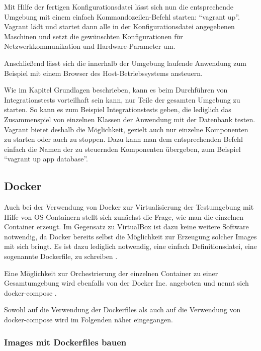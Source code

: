Mit Hilfe der fertigen Konfigurationsdatei lässt sich nun die entsprechende Umgebung mit einem einfach Kommandozeilen-Befehl starten: "`vagrant up"'. Vagrant lädt und startet dann alle in der Konfigurationsdatei angegebenen Maschinen und setzt die gewünschten Konfigurationen für Netzwerkkommunikation und Hardware-Parameter um.

Anschließend lässt sich die innerhalb der Umgebung laufende Anwendung zum Beispiel mit einem Browser des Host-Betriebssystems ansteuern.

Wie im Kapitel Grundlagen beschrieben, kann es beim Durchführen von Integrationstests vorteilhaft sein kann, nur Teile der gesamten Umgebung zu starten. So kann es zum Beispiel Integrationstests geben, die lediglich das Zusammenspiel von einzelnen Klassen der Anwendung mit der Datenbank testen. Vagrant bietet deshalb die Möglichkeit, gezielt auch nur einzelne Komponenten zu starten oder auch zu stoppen. Dazu kann man dem entsprechenden Befehl einfach die Namen der zu steuernden Komponenten übergeben, zum Beispiel "`vagrant up app database"'.

\subsection{Docker}

Auch bei der Verwendung von Docker zur Virtualisierung der Testumgebung mit Hilfe von OS-Containern stellt sich zunächst die Frage, wie man die einzelnen Container erzeugt. Im Gegensatz zu VirtualBox ist dazu keine weitere Software notwendig, da Docker bereits selbst die Möglichkeit zur Erzeugung solcher Images mit sich bringt. Es ist dazu lediglich notwendig, eine einfach Definitionsdatei, eine sogenannte Dockerfile, zu schreiben \citep[Vgl.][]{docker:003}.

Eine Möglichkeit zur Orchestrierung der einzelnen Container zu einer Gesamtumgebung wird ebenfalls von der Docker Inc. angeboten und nennt sich docker-compose \citep[Vgl.][]{dockercompose}.

Sowohl auf die Verwendung der Dockerfiles als auch auf die Verwendung von docker-compose wird im Folgenden näher eingegangen.

\subsubsection{Images mit Dockerfiles bauen}

